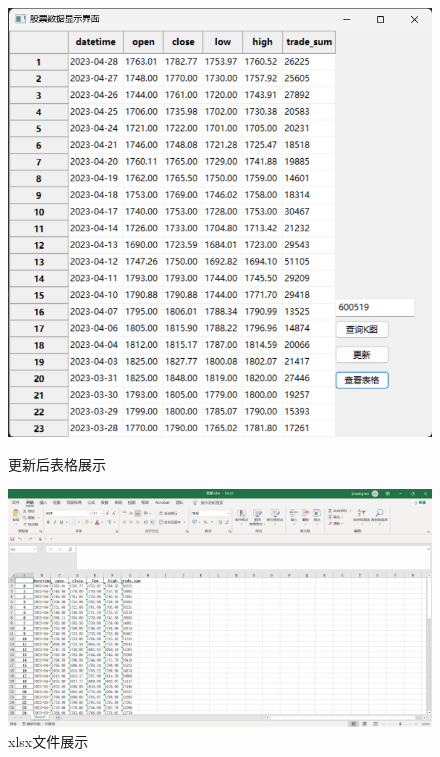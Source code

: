 \documentclass[UTF8,12pt]{article}
\begin{document}
\begin{figure}[htbp]
	\centering
	\begin{minipage}{0.49\linewidth}
		\centering
		\includegraphics[width=0.4\linewidth]{img/16.png}
		\caption{更新后表格展示}
		\label{5}%
	\end{minipage}
	\begin{minipage}{0.49\linewidth}
		\centering
		\includegraphics[width=0.9\linewidth]{img/17.png}
		\caption{xlsx文件展示}
		\label{6}%
	\end{minipage}
	\qquad
	

\end{figure}
\end{document}
